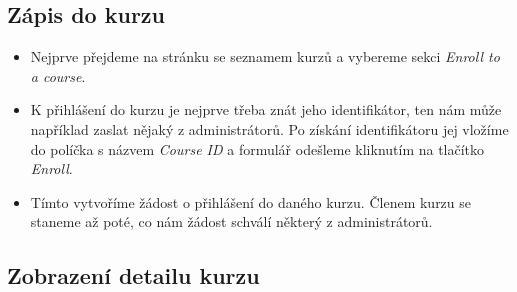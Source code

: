 \subsection{Zápis do kurzu}

\begin{itemize}
	\item Nejprve přejdeme na stránku se seznamem kurzů a vybereme sekci \textit{Enroll to a course}.
	\item K přihlášení do kurzu je nejprve třeba znát jeho identifikátor, ten nám může například zaslat nějaký z administrátorů. Po získání identifikátoru jej vložíme do políčka s názvem \textit{Course ID} a formulář odešleme kliknutím na tlačítko \textit{Enroll}.
	\item Tímto vytvoříme žádost o přihlášení do daného kurzu. Členem kurzu se staneme až poté, co nám žádost schválí některý z administrátorů.
\end{itemize}

\subsection{Zobrazení detailu kurzu}


